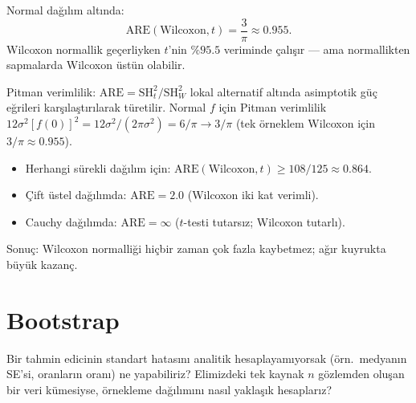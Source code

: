 \begin{teorem}\label{thm:are_wilcoxon}
Normal dağılım altında:
\[
  \mathrm{ARE}(\text{Wilcoxon},t) = \frac{3}{\pi} \approx 0.955.
\]
Wilcoxon normallik geçerliyken $t$'nin $\%95.5$ veriminde çalışır --- ama normallikten sapmalarda Wilcoxon üstün olabilir.
\end{teorem}

\begin{ispatiskele}
Pitman verimlilik: $\mathrm{ARE}=\mathrm{SH}^2_{t}/\mathrm{SH}^2_W$ lokal alternatif altında asimptotik güç eğrileri karşılaştırılarak türetilir. Normal $f$ için Pitman verimlilik $12\sigma^2[f(0)]^2 = 12\sigma^2 /(2\pi\sigma^2)=6/\pi\to3/\pi$ (tek örneklem Wilcoxon için $3/\pi\approx0.955$).
\end{ispatiskele}

\begin{teorem}
\begin{itemize}
  \item Herhangi sürekli dağılım için: $\mathrm{ARE}(\text{Wilcoxon},t)\geq108/125\approx0.864$.
  \item Çift üstel dağılımda: $\mathrm{ARE}=2.0$ (Wilcoxon iki kat verimli).
  \item Cauchy dağılımda: $\mathrm{ARE}=\infty$ ($t$-testi tutarsız; Wilcoxon tutarlı).
\end{itemize}
Sonuç: Wilcoxon normalliği hiçbir zaman çok fazla kaybetmez; ağır kuyrukta büyük kazanç.
\end{teorem}

\section{Bootstrap}
\label{sec:bootstrap}

\begin{kesif}
Bir tahmin edicinin standart hatasını analitik hesaplayamıyorsak
(örn.\ medyanın SE'si, oranların oranı) ne yapabiliriz?
Elimizdeki tek kaynak $n$ gözlemden oluşan bir veri kümesiyse,
örnekleme dağılımını nasıl yaklaşık hesaplarız?
\end{kesif}

